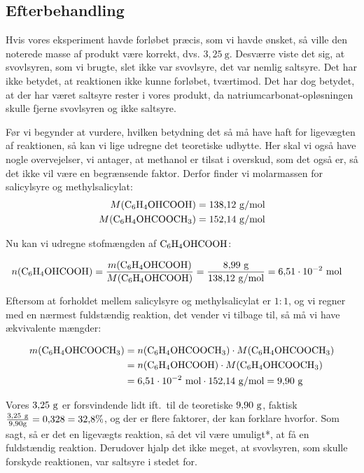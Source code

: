 \subsection*{Efterbehandling}
Hvis vores eksperiment havde forløbet præcis,
som vi havde ønsket, så ville den noterede
masse af produkt være korrekt, dvs. $3{,}25\ \unit{\gram}$.
Desværre viste det sig, at svovlsyren, som vi brugte, slet ikke var svovlsyre,
det var nemlig saltsyre. Det har ikke betydet,
at reaktionen ikke kunne forløbet, tværtimod.
Det har dog betydet, at der har været saltsyre 
rester i vores produkt, da natriumcarbonat-opløsningen
skulle fjerne svovlsyren og ikke saltsyre.

Før vi begynder at vurdere, hvilken betydning
det så må have haft for ligevægten af reaktionen,
så kan vi lige udregne det teoretiske udbytte.
Her skal vi også have nogle overvejelser, vi antager,
at methanol er tilsat i overskud, som det også er,
så det ikke vil være en begrænsende faktor.
Derfor finder vi molarmassen for salicylsyre og
methylsalicylat:
\begin{align*}
    M(\ce{C6H4OHCOOH})&=138{,}12\ \unit{\gram/\mol} \\
    M(\ce{C6H4OHCOOCH3})&=152{,}14\ \unit{\gram/\mol}
\end{align*}

Nu kan vi udregne stofmængden af $\ce{C6H4OHCOOH}$:

\begin{align*}
    n(\ce{C6H4OHCOOH})&=\frac{m(\ce{C6H4OHCOOH})}{
        M(\ce{C6H4OHCOOH})
    }=\frac{8{,}99\ \unit{\gram}}{138{,}12\ \unit{\gram/\mol}}
    =6{,}51 \cdot 10^{-2}\ \unit{\mol}
\end{align*}

Eftersom at forholdet mellem salicylsyre og methylsalicylat er $1:1$,
og vi regner med en nærmest fuldstændig reaktion, det vender vi tilbage til,
så må vi have ækvivalente mængder:

\begin{align*}
    m(\ce{C6H4OHCOOCH3})&=n(\ce{C6H4OHCOOCH3}) \cdot M(\ce{C6H4OHCOOCH3})
    \\
    &=n(\ce{C6H4OHCOOH}) \cdot M(\ce{C6H4OHCOOCH3})
    \\
    &=6{,}51 \cdot 10^{-2}\ \unit{\mol} \cdot 152{,}14\ \unit{\gram/\mol}
    =9{,}90\ \unit{\gram}
\end{align*}

Vores $3{,}25\ \g$ er forsvindende lidt ift.~til de teoretiske $9{,}90\ \g$,
faktisk $\frac{3{,}25\ \g}{9{,}90 \g}=0{,}328=32{,}8\%$,
og der er flere faktorer, der kan forklare hvorfor. Som sagt,
så er det en ligevægts reaktion, så det vil være umuligt*,
at få en fuldstændig reaktion. Derudover hjalp det ikke meget,
at svovlsyren, som skulle forskyde reaktionen, var saltsyre i stedet for.

